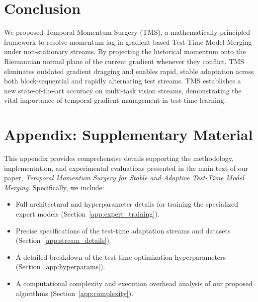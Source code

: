 \documentclass{article}
\theoremstyle{plain}
\theoremstyle{definition}
\theoremstyle{remark}
\begin{document}
\section{Conclusion}
\label{sec:conclusion}
We proposed Temporal Momentum Surgery (TMS), a mathematically principled framework to resolve momentum lag in gradient-based Test-Time Model Merging under non-stationary streams. By projecting the historical momentum onto the Riemannian normal plane of the current gradient whenever they conflict, TMS eliminates outdated gradient dragging and enables rapid, stable adaptation across both block-sequential and rapidly alternating test streams. TMS establishes a new state-of-the-art accuracy on multi-task vision streams, demonstrating the vital importance of temporal gradient management in test-time learning.




\newpage
\appendix
\onecolumn
\section{Appendix: Supplementary Material}
\label{sec:appendix}

This appendix provides comprehensive details supporting the methodology, implementation, and experimental evaluations presented in the main text of our paper, \emph{Temporal Momentum Surgery for Stable and Adaptive Test-Time Model Merging}. Specifically, we include:
\begin{itemize}
    \item Full architectural and hyperparameter details for training the specialized expert models (Section~\ref{app:expert_training}).
    \item Precise specifications of the test-time adaptation streams and datasets (Section~\ref{app:stream_details}).
    \item A detailed breakdown of the test-time optimization hyperparameters (Section~\ref{app:hyperparams}).
    \item A computational complexity and execution overhead analysis of our proposed algorithms (Section~\ref{app:complexity}).
\end{itemize}
\end{document}
